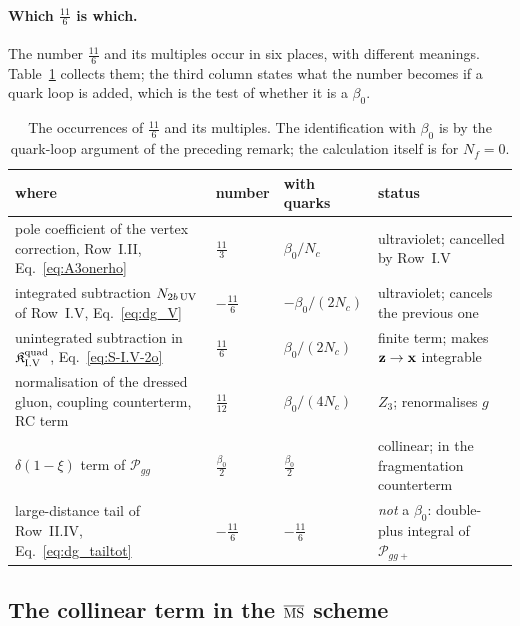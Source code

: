 \paragraph{Which $\frac{11}{6}$ is which.} The number $\frac{11}{6}$ and its multiples occur in six places, with different meanings. Table~\ref{tab:elevens} collects them; the third column states what the number becomes if a quark loop is added, which is the test of whether it is a $\beta_0$.
\begin{table}[t]
\centering
\renewcommand{\arraystretch}{1.25}
\footnotesize
\begin{tabular}{@{}>{\raggedright\arraybackslash}p{}>{\raggedright\arraybackslash}p{}>{\raggedright\arraybackslash}p{}>{\raggedright\arraybackslash}p{}@{}}
\toprule
where & number & with quarks & status\\
\midrule
pole coefficient of the vertex correction, Row~I.II, Eq.~\eqref{eq:A3onerho} & $\frac{11}{3}$ & $\beta_0/N_c$ & ultraviolet; cancelled by Row~I.V\\
integrated subtraction $N_{2b\,\rm UV}$ of Row~I.V, Eq.~\eqref{eq:dg_V} & $-\frac{11}{6}$ & $-\beta_0/(2N_c)$ & ultraviolet; cancels the previous one\\
unintegrated subtraction in $\mathfrak K^{\rm quad}_{\rm I.V}$, Eq.~\eqref{eq:S-I.V-2o} & $\frac{11}{6}$ & $\beta_0/(2N_c)$ & finite term; makes $\mathbf{z}\to\mathbf{x}$ integrable\\
normalisation of the dressed gluon, coupling counterterm, RC term & $\frac{11}{12}$ & $\beta_0/(4N_c)$ & $Z_3$; renormalises $g$\\
$\delta(1-\xi)$ term of $\mathcal P_{gg}$ & $\frac{\beta_0}{2}$ & $\frac{\beta_0}{2}$ & collinear; in the fragmentation counterterm\\
large-distance tail of Row~II.IV, Eq.~\eqref{eq:dg_tailtot} & $-\frac{11}{6}$ & $-\frac{11}{6}$ & \emph{not} a $\beta_0$: double-plus integral of $\mathcal P_{gg+}$\\
\bottomrule
\end{tabular}
\caption{The occurrences of $\frac{11}{6}$ and its multiples. The identification with $\beta_0$ is by the quark-loop argument of the preceding remark; the calculation itself is for $N_f=0$.}
\label{tab:elevens}
\end{table}

\subsection{The collinear term in the \texorpdfstring{$\overline{\rm MS}$}{MS-bar} scheme}\label{sec:dg_msbar}

